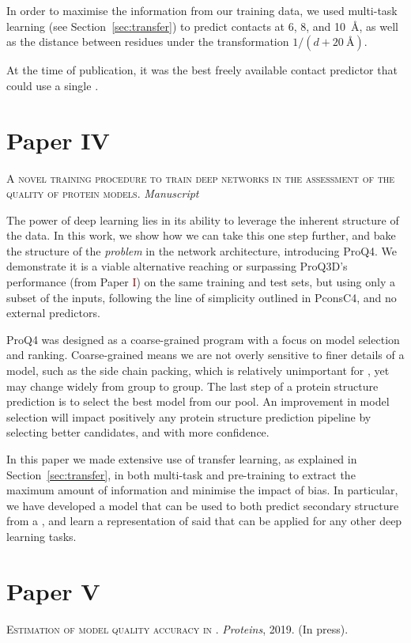 In order to maximise the information from our training data, we used multi-task learning (see Section~\ref{sec:transfer}) to predict contacts at 6, 8, and \SI{10}{\angstrom}, as well as the distance between residues under the transformation $1/(d + \SI{20}{\angstrom})$.

At the time of publication, it was the best freely available contact predictor that could use a single \MSA.


\section*{Paper \textcolor[cmyk]{0, 0.87, 0.68, 0.32}{IV}}
\begin{center}
	\textsc{A novel training procedure to train deep networks in the assessment of the quality of protein models.}
	\emph{Manuscript}
\end{center}

\noindent
The power of deep learning lies in its ability to leverage the inherent structure of the data.
In this work, we show how we can take this one step further, and bake the structure of the \emph{problem} in the network architecture, introducing ProQ4.
We demonstrate it is a viable alternative reaching or surpassing ProQ3D's performance (from Paper \textcolor{Maroon}{I}) on the same training and test sets, but  using only a subset of the inputs, following the line of simplicity outlined in PconsC4, and no external predictors.

ProQ4 was designed as a coarse-grained program with a focus on model selection and ranking.
Coarse-grained means we are not overly sensitive to finer details of a model, such as the side chain packing, which is relatively unimportant for \MQA, yet may change widely from group to group.
The last step of a protein structure prediction is to select the best model from our pool.
An improvement in model selection will impact positively any protein structure prediction pipeline by selecting better candidates, and with more confidence.

In this paper we made extensive use of transfer learning, as explained in Section~\ref{sec:transfer}, in both multi-task and pre-training to extract the maximum amount of information and minimise the impact of bias.
In particular, we have developed a model that can be used to both predict secondary structure from a \MSA, and learn a representation of said \MSA{} that can be applied for any other deep learning tasks.


\section*{Paper \textcolor[cmyk]{0, 0.87, 0.68, 0.32}{V}}
\begin{center}
	\textsc{Estimation of model quality accuracy in .}
	\emph{Proteins}, 2019. (In press).
\end{center}

